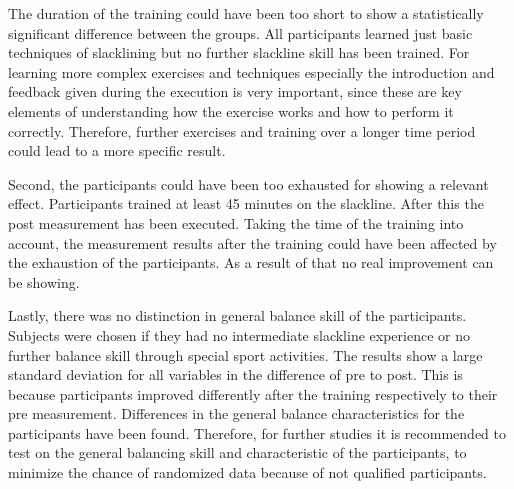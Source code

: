 The duration of the training could have been too short to show a statistically significant difference between the groups.
All participants learned just basic techniques of slacklining but no further slackline skill has been trained.
For learning more complex exercises and techniques especially the introduction and feedback given during the execution is very important, since these are key elements of understanding how the exercise works and how to perform it correctly.
Therefore, further exercises and training over a longer time period could lead to a more specific result.

Second, the participants could have been too exhausted for showing a relevant effect.
Participants trained at least 45 minutes on the slackline.
After this the post measurement has been executed.
Taking the time of the training into account, the measurement results after the training could have been affected by the exhaustion of the participants. 
As a result of that no real improvement can be showing.



Lastly, there was no distinction in general balance skill of the participants.
Subjects were chosen if they had no intermediate slackline experience or no further balance skill through special sport activities.
The results show a large standard deviation for all variables in the difference of pre to post.
This is because participants improved differently after the training respectively to their pre measurement.
Differences in the general balance characteristics for the participants have been found.
Therefore, for further studies it is recommended to test on the general balancing skill and characteristic of the participants, to minimize the chance of randomized data because of not qualified participants.

